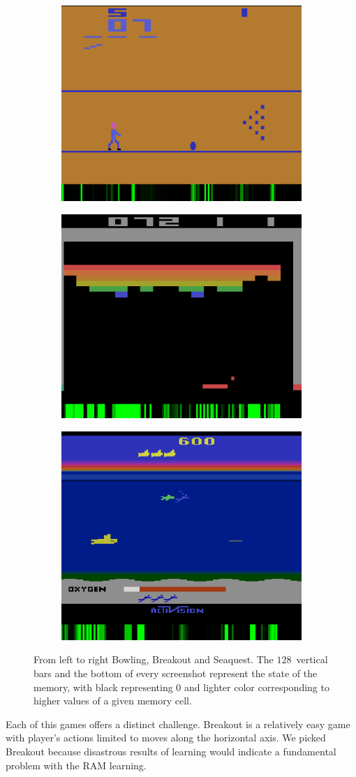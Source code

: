 \begin{figure}
\begin{center}
\begin{subfigure}
  \centering
  \includegraphics[width=.325\linewidth]{images/bowling1.png}
  \label{fig:sub1}
\end{subfigure}
\begin{subfigure}
  \centering
   \includegraphics[width=.31\linewidth]{images/breakout2.png}
  \label{fig:sub2}
\end{subfigure}%
\begin{subfigure}
  \centering
  \includegraphics[width=.30\linewidth]{images/seaquest2.png}
  \label{fig:sub3}
\end{subfigure}
\caption{From left to right Bowling, Breakout and Seaquest. The $128$~vertical bars and the bottom of every screenshot represent the state of the memory, with black representing $0$ and lighter color corresponding to higher values of a given memory cell. }
\end{center}
\label{fig:screenshots}
\end{figure}

Each of this games offers a distinct challenge. Breakout is a relatively easy game with player's actions limited to moves along the horizontal axis. We picked Breakout because disastrous results of learning would indicate a fundamental problem with the RAM learning.

